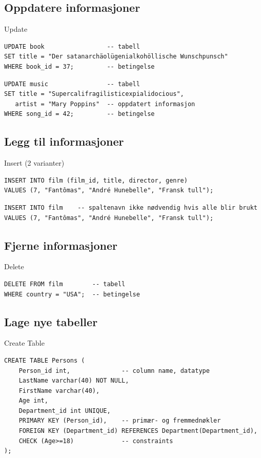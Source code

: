 \subsection*{Oppdatere informasjoner}
\begin{frame}[fragile]{Update}
\begin{verbatim}
UPDATE book                 -- tabell
SET title = "Der satanarchäolügenialkohöllische Wunschpunsch"
WHERE book_id = 37;         -- betingelse
\end{verbatim}
\pause
\vspace{-5mm}
\begin{verbatim}
UPDATE music                -- tabell
SET title = "Supercalifragilisticexpialidocious",
   artist = "Mary Poppins"  -- oppdatert informasjon
WHERE song_id = 42;         -- betingelse
\end{verbatim}
\end{frame}

\subsection*{Legg til informasjoner}
\begin{frame}[fragile]{Insert (2 varianter)}
\begin{verbatim}
INSERT INTO film (film_id, title, director, genre)
VALUES (7, "Fantômas", "André Hunebelle", "Fransk tull"); 
\end{verbatim}
\pause
\begin{verbatim}
INSERT INTO film    -- spaltenavn ikke nødvendig hvis alle blir brukt
VALUES (7, "Fantômas", "André Hunebelle", "Fransk tull"); 
\end{verbatim}
\end{frame}

\subsection*{Fjerne informasjoner}
\begin{frame}[fragile]{Delete}
\begin{verbatim}
DELETE FROM film        -- tabell
WHERE country = "USA";  -- betingelse
\end{verbatim}
\end{frame}

\subsection*{Lage nye tabeller}
\begin{frame}[fragile]{Create Table}
\begin{verbatim}
CREATE TABLE Persons (
    Person_id int,              -- column name, datatype
    LastName varchar(40) NOT NULL,
    FirstName varchar(40),
    Age int,
    Department_id int UNIQUE,
    PRIMARY KEY (Person_id),    -- primær- og fremmednøkler
    FOREIGN KEY (Department_id) REFERENCES Department(Department_id),
    CHECK (Age>=18)             -- constraints
);
\end{verbatim}
\end{frame}

